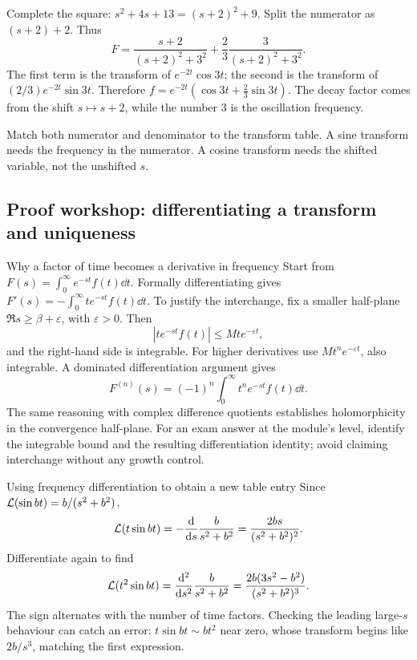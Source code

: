 \begin{answer}
Complete the square: $s^2+4s+13=(s+2)^2+9$. Split the numerator as $(s+2)+2$. Thus
\[F=\frac{s+2}{(s+2)^2+3^2}+\frac23\frac3{(s+2)^2+3^2}.\]
The first term is the transform of $e^{-2t}\cos3t$; the second is the transform of $(2/3)e^{-2t}\sin3t$. Therefore $f=e^{-2t}(\cos3t+\frac23\sin3t)$. The decay factor comes from the shift $s\mapsto s+2$, while the number $3$ is the oscillation frequency.
\end{answer}
\begin{tip}
Match both numerator and denominator to the transform table. A sine transform needs the frequency in the numerator. A cosine transform needs the shifted variable, not the unshifted $s$.
\end{tip}


\subsection{Proof workshop: differentiating a transform and uniqueness}
\begin{concept}{Why a factor of time becomes a derivative in frequency}
Start from $F(s)=\int_0^\infty e^{-st}f(t)\dd t$. Formally differentiating gives $F'(s)=-\int_0^\infty te^{-st}f(t)\dd t$. To justify the interchange, fix a smaller half-plane $\Re s\geq\beta+\varepsilon$, with $\varepsilon>0$. Then
\[|te^{-st}f(t)|\leq Mt e^{-\varepsilon t},\]
and the right-hand side is integrable. For higher derivatives use $Mt^ne^{-\varepsilon t}$, also integrable. A dominated differentiation argument gives
\[F^{(n)}(s)=(-1)^n\int_0^\infty t^ne^{-st}f(t)\dd t.\]
The same reasoning with complex difference quotients establishes holomorphicity in the convergence half-plane. For an exam answer at the module's level, identify the integrable bound and the resulting differentiation identity; avoid claiming interchange without any growth control.
\end{concept}
\begin{worked}{Using frequency differentiation to obtain a new table entry}
Since $\mathcal L(\sin bt)=b/(s^2+b^2)$,
\[\mathcal L(t\sin bt)=-\frac{\mathrm d}{\mathrm ds}\frac b{s^2+b^2}=\frac{2bs}{(s^2+b^2)^2}.\]
Differentiate again to find
\[\mathcal L(t^2\sin bt)=\frac{\mathrm d^2}{\mathrm ds^2}\frac b{s^2+b^2}=\frac{2b(3s^2-b^2)}{(s^2+b^2)^3}.\]
The sign alternates with the number of time factors. Checking the leading large-$s$ behaviour can catch an error: $t\sin bt\sim bt^2$ near zero, whose transform begins like $2b/s^3$, matching the first expression.
\end{worked}
